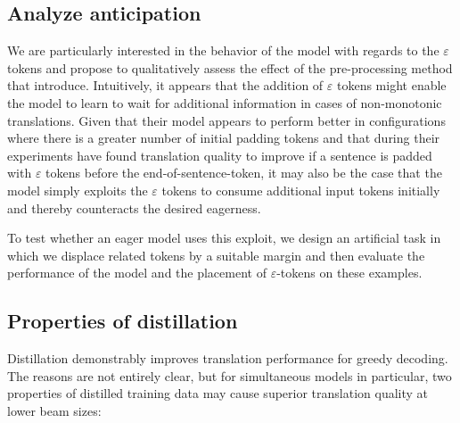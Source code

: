 \documentclass[english]{uzhpub}
\begin{document}
\subsection{Analyze anticipation}


We are particularly interested in the behavior of the model with regards to the $\varepsilon$ tokens and propose to qualitatively assess the effect of the pre-processing method that \cite{youmaynotneedattention} introduce.
Intuitively, it appears that the addition of $\varepsilon$ tokens might enable the model to learn to wait for additional information in cases of non-monotonic translations. Given that their model appears to perform better in configurations where there is a greater number of initial padding tokens and that during their experiments \cite{youmaynotneedattention} have found translation quality to improve if a sentence is padded with $\varepsilon$ tokens before the end-of-sentence-token, it may also be the case that the model simply exploits the $\varepsilon$ tokens to consume additional input tokens initially and thereby counteracts the desired eagerness.

To test whether an eager model uses this exploit, we design an artificial task in which we displace related tokens by a suitable margin and then evaluate the performance of the model and the placement of $\varepsilon$-tokens on these examples.


\subsection{Properties of distillation}

Distillation demonstrably improves translation performance for greedy decoding. The reasons are not entirely clear, but for simultaneous models in particular, two properties of distilled training data may cause superior translation quality at lower beam sizes:
\end{document}
